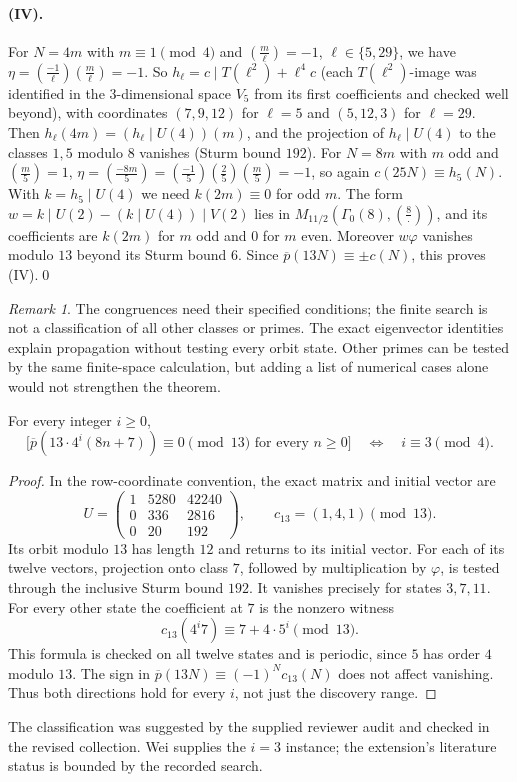 \documentclass[11pt]{article}
\theoremstyle{remark}\newtheorem{remark}[theorem]{Remark}
\newcommand{\pb}{\overline{p}}
\newcommand{\leg}[2]{\left(\frac{#1}{#2}\right)}
\begin{document}
\paragraph{(IV).} For $N=4m$ with $m\equiv1\pmod4$ and $\leg m\ell=-1$, $\ell\in\{5,29\}$, we have $\eta=\leg{-1}\ell\leg m\ell=-1$. So $h_\ell=c\mid T(\ell^2)+\ell^4c$ (each $T(\ell^2)$-image was identified in the $3$-dimensional space $V_5$ from its first coefficients and checked well beyond), with coordinates $(7,9,12)$ for $\ell=5$ and $(5,12,3)$ for $\ell=29$. Then $h_\ell(4m)=(h_\ell\mid U(4))(m)$, and the projection of $h_\ell\mid U(4)$ to the classes $1,5$ modulo $8$ vanishes (Sturm bound $192$). For $N=8m$ with $m$ odd and $\leg m5=1$, $\eta=\leg{-8m}{5}=\leg{-1}5\leg25\leg m5=-1$, so again $c(25N)\equiv h_5(N)$. With $k=h_5\mid U(4)$ we need $k(2m)\equiv0$ for odd $m$. The form $w=k\mid U(2)-(k\mid U(4))\mid V(2)$ lies in $M_{11/2}(\Gamma_0(8),\leg8\cdot)$, and its coefficients are $k(2m)$ for $m$ odd and $0$ for $m$ even. Moreover $w\varphi$ vanishes modulo $13$ beyond its Sturm bound $6$. Since $\pb(13N)\equiv\pm c(N)$, this proves (IV).\qed

\begin{remark}
The congruences need their specified conditions; the finite search is not a classification of all other classes or primes. The exact eigenvector identities explain propagation without testing every orbit state. Other primes can be tested by the same finite-space calculation, but adding a list of numerical cases alone would not strengthen the theorem.
\end{remark}

\begin{proposition}\label{prop:class13}
For every integer $i\ge0$,
\[\bigl[\pb(13\cdot4^i(8n+7))\equiv0\pmod{13}\text{ for every }n\ge0\bigr]
\quad\Longleftrightarrow\quad i\equiv3\pmod4.\]
\end{proposition}
\begin{proof} In the row-coordinate convention, the exact matrix and initial vector are
\[U=\begin{pmatrix}1&5280&42240\\0&336&2816\\0&20&192\end{pmatrix},\qquad c_{13}=(1,4,1)\pmod{13}.\]
Its orbit modulo $13$ has length $12$ and returns to its initial vector. For each of its twelve vectors, projection onto class $7$, followed by multiplication by $\varphi$, is tested through the inclusive Sturm bound $192$. It vanishes precisely for states $3,7,11$. For every other state the coefficient at $7$ is the nonzero witness
\[c_{13}(4^i7)\equiv7+4\cdot5^i\pmod{13}.\]
This formula is checked on all twelve states and is periodic, since $5$ has order $4$ modulo $13$. The sign in $\pb(13N)\equiv(-1)^Nc_{13}(N)$ does not affect vanishing. Thus both directions hold for every $i$, not just the discovery range.\end{proof}
The classification was suggested by the supplied reviewer audit and checked in the revised collection. Wei supplies the $i=3$ instance; the extension's literature status is bounded by the recorded search.
\end{document}
